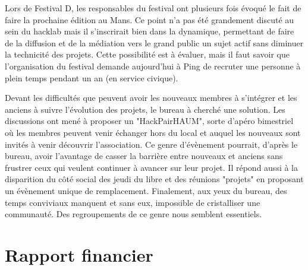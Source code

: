 \documentclass[11pt]{article}
\begin{document}
Lors de Festival D, les responsables du festival ont plusieurs fois évoqué le fait de
faire la prochaine édition au Mans. Ce point n'a pas été grandement discuté au sein du
hacklab mais il s'inscrirait bien dans la dynamique, permettant de faire de la diffusion
et de la médiation vers le grand public un sujet actif sans diminuer la technicité des
projets. Cette possibilité est à évaluer, mais il faut savoir que l'organisation du
festival demande aujourd'hui à Ping de recruter une personne à plein temps pendant un an
(en service civique).

Devant les difficultés que peuvent avoir les nouveaux membres à s'intégrer et les anciens
à suivre l'évolution des projets, le bureau à cherché une solution. Les discussions ont
mené à proposer un "HackPairHAUM", sorte d'apéro bimestriel où les membres peuvent venir
échanger hors du local et auquel les nouveaux sont invités à venir découvrir
l'association. Ce genre d'évènement pourrait, d'après le bureau, avoir l'avantage de
casser la barrière entre nouveaux et anciens sans frustrer ceux qui veulent continuer à
avancer sur leur projet. Il répond aussi à la disparition du côté social des jeudi du
libre et des réunions "projets" en proposant un évènement unique de remplacement.
Finalement, aux yeux du bureau, des temps conviviaux manquent et sans eux, impossible de
cristalliser une communauté. Des regroupements de ce genre nous semblent essentiels.

\section{Rapport financier}
\end{document}
